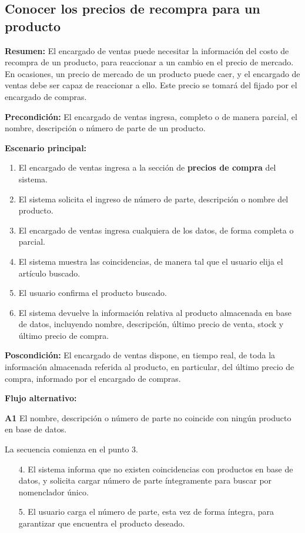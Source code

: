 \pagebreak

\subsection{Conocer los precios de recompra para un producto}
 
\textbf{Resumen:}
El encargado de ventas puede necesitar la información del costo de recompra de un producto,
para reaccionar a un cambio en el precio de mercado.
En ocasiones, un precio de mercado de un producto puede caer,
y el encargado de ventas debe ser capaz de reaccionar a ello.
Este precio se tomará del fijado por el encargado de compras.

\textbf{Precondición:} 
El encargado de ventas ingresa, completo o de manera parcial, el nombre, descripción o número de parte de un producto.

\textbf{Escenario principal:}
\begin{enumerate}
	\item El encargado de ventas ingresa a la sección de \textbf{precios de compra} del sistema.
	\item El sistema solicita el ingreso de número de parte, descripción o nombre del producto.
	\item El encargado de ventas ingresa cualquiera de los datos, de forma completa o parcial.
	\item El sistema muestra las coincidencias, de manera tal que el usuario elija el artículo buscado.
	\item El usuario confirma el producto buscado.
	\item El sistema devuelve la información relativa al producto almacenada en base de datos,
	incluyendo nombre, descripción, último precio de venta, stock y último precio de compra.
\end{enumerate}

\textbf{Poscondición:}
El encargado de ventas dispone, en tiempo real,
de toda la información almacenada referida al producto,
en particular,
del último precio de compra,
informado por el encargado de compras.

\textbf{Flujo alternativo:}

\textbf{A1} El nombre, descripción o número de parte no coincide con ningún producto en base de datos.

La secuencia comienza en el punto 3.

\begin{enumerate}
	\item[4.] El sistema informa que no existen coincidencias con productos en base de datos,
	y solicita cargar número de parte íntegramente para buscar por nomenclador único.
	\item[5.] El usuario carga el número de parte, esta vez de forma íntegra,
	para garantizar que encuentra el producto deseado.
\end{enumerate}

